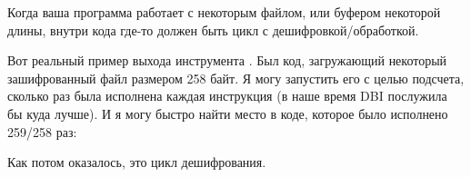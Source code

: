
Когда ваша программа работает с некоторым файлом, или буфером некоторой длины,
внутри кода где-то должен быть цикл с дешифровкой/обработкой.

Вот реальный пример выхода инструмента \tracer.
Был код, загружающий некоторый зашифрованный файл размером 258 байт.
Я могу запустить его с целью подсчета, сколько раз была исполнена каждая инструкция (в наше время \ac{DBI} послужила бы куда лучше).
И я могу быстро найти место в коде, которое было исполнено 259/258 раз:



Как потом оказалось, это цикл дешифрования.

